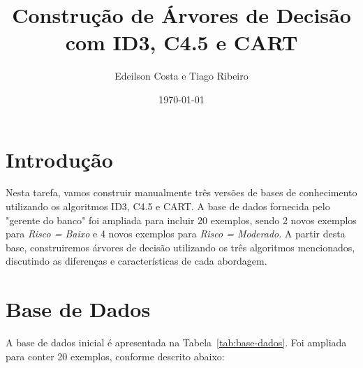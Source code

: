 \documentclass[a4paper,12pt]{article}
\title{Construção de Árvores de Decisão com ID3, C4.5 e CART}
\author{Edeilson Costa e Tiago Ribeiro}
\date{\today}
\begin{document}
\maketitle

\section{Introdução}
Nesta tarefa, vamos construir manualmente três versões de bases de conhecimento utilizando os algoritmos ID3, C4.5 e CART. A base de dados fornecida pelo "gerente do banco" foi ampliada para incluir 20 exemplos, sendo 2 novos exemplos para \textit{Risco = Baixo} e 4 novos exemplos para \textit{Risco = Moderado}. A partir desta base, construiremos árvores de decisão utilizando os três algoritmos mencionados, discutindo as diferenças e características de cada abordagem.

\section{Base de Dados}
A base de dados inicial é apresentada na Tabela~\ref{tab:base-dados}. Foi ampliada para conter 20 exemplos, conforme descrito abaixo:
\end{document}
